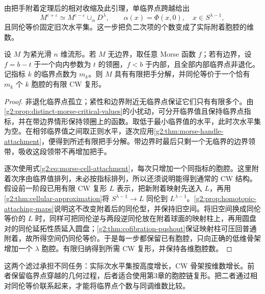 由把手附着定理后的相对收缩及此引理，单临界点跨越给出
\begin{equation}\label{g2:eq:morse-cell-attachment}
	M^{c+\varepsilon}\simeq
	M^{c-\varepsilon}\cup_\alpha D^\lambda,
	\qquad
	\alpha(x)=\Phi(x,0),\quad x\in S^{\lambda-1},
\end{equation}
且同伦等价固定旧次水平集。这一步把负二次项的个数变成了实际附着胞腔的维数。

\begin{corollary}\label{g2:cor:morse-cell-type}
	设 \(M\) 为紧光滑 \(n\) 维流形。若 \(M\) 无边界，取任意 Morse 函数 \(f\)；若有边界，设 \(f=b-t\) 于一个向内参数为 \(t\) 的领圈，\(f<b\) 于内部，且全部内部临界点非退化。记指标 \(k\) 的临界点数为 \(m_k\)。则 \(M\) 具有有限把手分解，并同伦等价于一个恰有 \(m_k\) 个 \(k\) 胞腔的有限 CW 复形。
\end{corollary}
\begin{proof}
	非退化临界点孤立；紧性和边界附近无临界点保证它们只有有限多个。由\cref{g2:prop:distinct-morse-critical-values}的小扰动，可分开临界值且保持临界点指标，并在带边界情形保持领圈上的函数。取低于最小临界值的水平，此时次水平集为空。在相邻临界值之间取正则水平，逐次应用\cref{g2:thm:morse-handle-attachment}，便得到所述有限把手分解。带边界时最后只剩一个无临界的边界领带，吸收这段领带不再增加把手。

	逐次使用式\eqref{g2:eq:morse-cell-attachment}，每次只增加一个同指标的胞腔。这里附着次序由临界值排列，未必按指标排列，所以还须说明能得到通常的 CW 结构。假设前一阶段已用有限 CW 复形 \(L\) 表示，把新附着映射先送入 \(L\)，再用\cref{g2:thm:cellular-approximation}将 \(S^{\lambda-1}\to L\) 同伦到 \(L^{\lambda-1}\)。\cref{g2:prop:homotopic-attaching-maps}说明这不改变附着后的同伦型，并保持旧空间。将旧空间换成同伦等价的 \(L\) 时，同样可把同伦逆与两段逆同伦放在附着球面的映射柱上，再用圆盘对的同伦延拓性质延入圆盘；\cref{g2:thm:cofibration-pushout}保证映射柱可压回普通附着，故所得空间仍同伦等价。于是每一步都保留已有胞腔，只向正确的低维骨架增加一个 \(\lambda\) 胞腔。有限归纳得到所需 CW 复形，并保持各维胞腔数。
\end{proof}

这两个滤过承担不同任务：实际次水平集按高度增长，CW 骨架按维数增长。前者保留临界点穿越的几何过程，后者适合使用第3章的胞腔链复形。把二者通过相对同伦等价联系起来，才能将临界点个数与同调维数比较。
